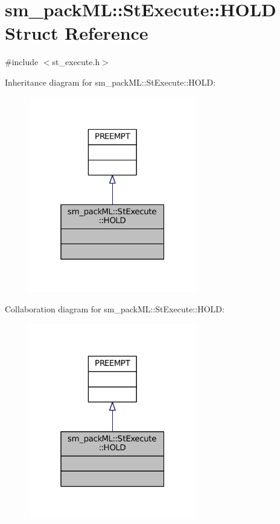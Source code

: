 \hypertarget{structsm__packML_1_1StExecute_1_1HOLD}{}\section{sm\+\_\+pack\+ML\+:\+:St\+Execute\+:\+:H\+O\+LD Struct Reference}
\label{structsm__packML_1_1StExecute_1_1HOLD}


{\ttfamily \#include $<$st\+\_\+execute.\+h$>$}



Inheritance diagram for sm\+\_\+pack\+ML\+:\+:St\+Execute\+:\+:H\+O\+LD\+:
\nopagebreak
\begin{figure}[H]
\begin{center}
\leavevmode
\includegraphics[width=208pt]{structsm__packML_1_1StExecute_1_1HOLD__inherit__graph}
\end{center}
\end{figure}


Collaboration diagram for sm\+\_\+pack\+ML\+:\+:St\+Execute\+:\+:H\+O\+LD\+:
\nopagebreak
\begin{figure}[H]
\begin{center}
\leavevmode
\includegraphics[width=208pt]{structsm__packML_1_1StExecute_1_1HOLD__coll__graph}
\end{center}
\end{figure}


